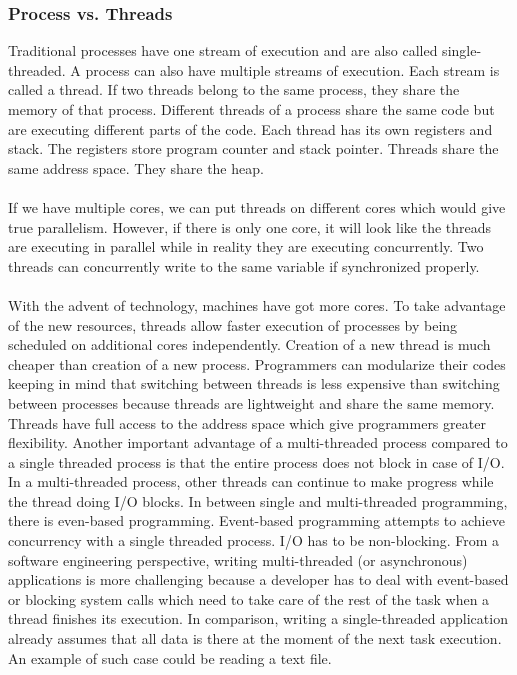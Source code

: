 \documentclass[twoside]{article}
\begin{document}
\subsubsection{Process vs. Threads}
Traditional processes have one stream of execution and are also called single-threaded. A process can also have multiple streams of execution. Each stream is called a thread. If two threads belong to the same process, they share the memory of that process. Different threads of a process share the same code but are executing different parts of the code. Each thread has its own registers and stack. The registers store program counter and stack pointer. Threads share the same address space. They share the heap. \\ \\
If we have multiple cores, we can put threads on different cores which would give true parallelism. However, if there is only one core, it will look like the threads are executing in parallel while in reality they are executing concurrently. Two threads can concurrently write to the same variable if synchronized properly. \\ \\
With the advent of technology, machines have got more cores. To take advantage of the new resources, threads allow faster execution of processes by being scheduled on additional cores independently. Creation of a new thread is much cheaper than creation of a new process. Programmers can modularize their codes keeping in mind that switching between threads is less expensive than switching between processes because threads are lightweight and share the same memory. Threads have full access to the address space which give programmers greater flexibility. Another important advantage of a multi-threaded process compared to a single threaded process is that the entire process does not block in case of I/O. In a multi-threaded process, other threads can continue to make progress while the thread doing I/O blocks. In between single and multi-threaded programming, there is even-based programming. Event-based programming attempts to achieve concurrency with a single threaded process. I/O has to be non-blocking. From a software engineering perspective, writing multi-threaded (or asynchronous) applications is more challenging because a developer has to deal with event-based or blocking system calls which need to take care of the rest of the task when a thread finishes its execution. In comparison, writing a single-threaded application already assumes that all data is there at the moment of the next task execution. An example of such case could be reading a text file. \\ \\
\end{document}
